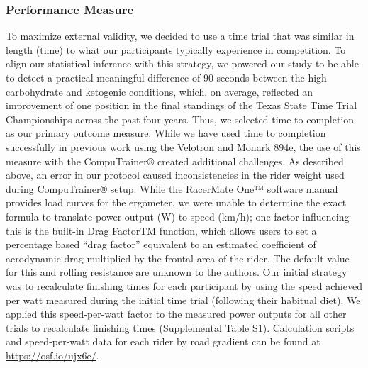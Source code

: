 \documentclass[]{cik}%
\begin{document}
\hypertarget{performance-measure}{%
\subsubsection{Performance Measure}\label{performance-measure}}

To maximize external validity, we decided to use a time trial that was
similar in length (time) to what our participants typically experience
in competition. To align our statistical inference with this strategy,
we powered our study to be able to detect a practical meaningful
difference of 90 seconds between the high carbohydrate and ketogenic
conditions, which, on average, reflected an improvement of one position
in the final standings of the Texas State Time Trial Championships
across the past four years. Thus, we selected time to completion as our
primary outcome measure. While we have used time to completion
successfully in previous work using the Velotron and Monark 894e, the
use of this measure with the CompuTrainer® created additional
challenges. As described above, an error in our protocol caused
inconsistencies in the rider weight used during CompuTrainer® setup.
While the RacerMate One™ software manual provides load curves for the
ergometer, we were unable to determine the exact formula to translate
power output (W) to speed (km/h); one factor influencing this is the
built-in Drag FactorTM function, which allows users to set a percentage
based ``drag factor'' equivalent to an estimated coefficient of
aerodynamic drag multiplied by the frontal area of the rider. The
default value for this and rolling resistance are unknown to the
authors. Our initial strategy was to recalculate finishing times for
each participant by using the speed achieved per watt measured during
the initial time trial (following their habitual diet). We applied this
speed-per-watt factor to the measured power outputs for all other trials
to recalculate finishing times (Supplemental Table S1). Calculation
scripts and speed-per-watt data for each rider by road gradient can be
found at \url{https://osf.io/ujx6e/}.
\end{document}
